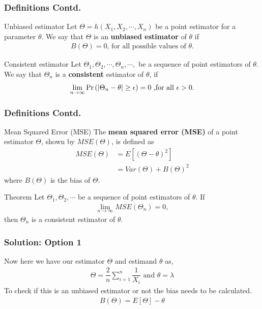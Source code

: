 \documentclass{beamer}
\providecommand{\brak}[1]{\ensuremath{\left(#1\right)}}
\begin{document}
\begin{frame}
\frametitle{Definitions Contd.}
\begin{block}{Unbiased estimator}
 Let $\Theta = h(X_1,X_2, \cdots , X_n) $ be a point estimator for a parameter $ \theta $. We say that $ \Theta $ is an \textbf{unbiased estimator} of $ \theta $ if
    \begin{align}
       B(\Theta )= 0 \text{, for all possible values of $\theta$.}
    \end{align}
\end{block}
\begin{block}{Consistent estimator}
 Let $ \Theta_1,\Theta_2, \cdots, \Theta_n , \cdots, $  be a sequence of point estimators of $ \theta $. We say that $ \Theta_n $ is a \textbf{consistent} estimator of $ \theta $, if 
\begin{align}
    \lim_{n\to\infty} \Pr\brak{| \Theta_n - \theta | \ge \epsilon} = 0 \text{ ,for all $ \epsilon > 0$.}
\end{align}
\end{block}
\end{frame}

\begin{frame}
\frametitle{Definitions Contd.}
\begin{block}{Mean Squared Error (MSE)}
 The \textbf{mean squared error (MSE)} of a point estimator $ \Theta $, shown by $ MSE(\Theta) $, is defined as
\begin{align}
    MSE(\Theta ) &= E[(\Theta - \theta)^2] \\
    &= Var(\Theta) + B(\Theta)^2
\end{align}
where $ B(\Theta ) $ is the bias of $ \Theta $. 
\end{block}
\begin{block}{Theorem}
  Let $ \Theta_1,\Theta_2 , \cdots$ be a sequence of point estimators of $ \theta $. If
\begin{align}
     \lim_{n\to\infty} MSE( \Theta_n) = 0,
\end{align}
then $ \Theta_n $ is a consistent estimator of $ \theta$.
\end{block}
\end{frame}
\begin{frame}
\frametitle{Solution: Option 1}
 Now here we have our estimator $ \Theta$ and estimand $ \theta $ as,
 \begin{align}
     \Theta = \dfrac{2}{n} \sum_{i=1}^{n} \dfrac{1}{X_i} \text{  and  }
     \theta = \lambda
 \end{align}
 To check if this is an unbiased estimator or not the bias needs to be calculated.
 \begin{align}
    B(\Theta ) = E[\Theta ] - \theta
\end{align}
\end{frame}
\end{document}
